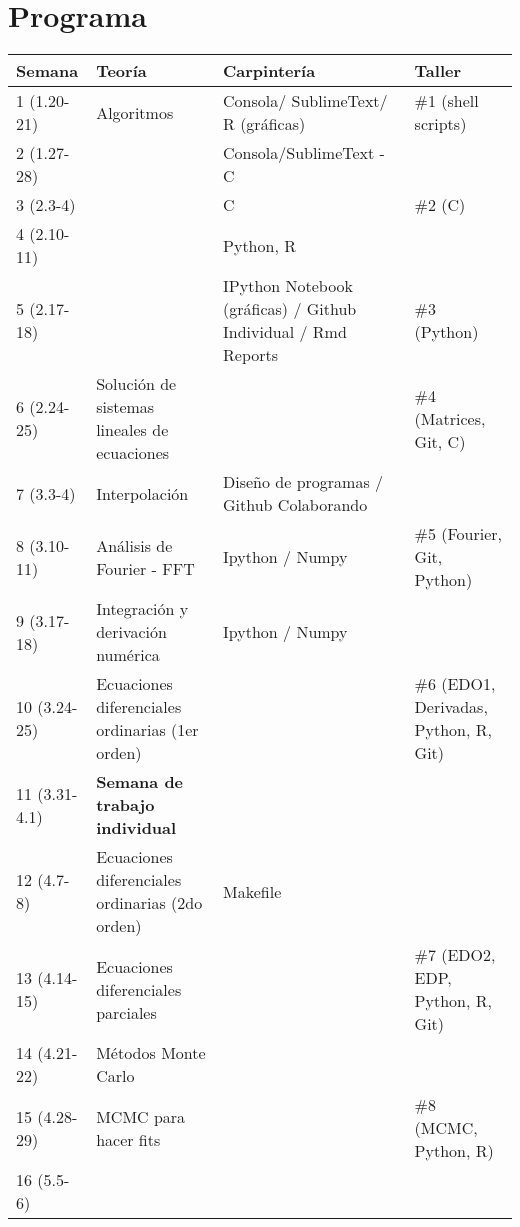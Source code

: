\documentclass[11pt]{article}
\begin{document}
 

\section*{Programa}

\begin{center}
\begin{tabular}{|p{2.1cm}|p{5.7cm}|p{4.0cm}|p{4.5cm}|}
\hline

Semana & Teor\'ia & Carpinter\'ia & Taller \\\hline
1 (1.20-21) & Algoritmos	& Consola/ SublimeText/ R (gr\'aficas) & \#1 (shell scripts)\\\hline
2 (1.27-28)& 	& Consola/SublimeText - C  & \\\hline
3 (2.3-4)& 	&C  & \#2 (C)\\\hline
4 (2.10-11)& 	&Python, R &  \\\hline
5 (2.17-18)& 	&IPython Notebook (gr\'aficas) / Github Individual / Rmd Reports & \#3
(Python) \\\hline
6 (2.24-25)&      Soluci\'on de sistemas lineales de ecuaciones &  & \#4
(Matrices, Git, C)\\\hline
7 (3.3-4)&  Interpolaci\'on & Dise\~no de programas / Github Colaborando & \\ \hline
8 (3.10-11)& An\'alisis de Fourier - FFT &  Ipython / Numpy& \#5 (Fourier, Git, Python)\\\hline
9 (3.17-18) & Integraci\'on y derivaci\'on num\'erica & Ipython / Numpy & \\\hline
10 (3.24-25) & Ecuaciones diferenciales ordinarias (1er orden)& &  \#6
(EDO1, Derivadas, Python, R, Git)\\\hline
11 (3.31-4.1) & {\bf Semana de trabajo individual} & &\\\hline
12 (4.7-8)& Ecuaciones diferenciales ordinarias (2do orden)&  Makefile &   \\\hline 
13 (4.14-15) & Ecuaciones diferenciales parciales & & \#7 (EDO2, EDP, Python, R, Git)\\\hline
14 (4.21-22) & M\'etodos Monte Carlo &   & \\\hline
15 (4.28-29) & MCMC para hacer fits &    & \#8 (MCMC, Python, R)\\\hline
16 (5.5-6) &  &    & \\\hline

\hline
\end{tabular}
\end{center}

\newpage
\end{document}
